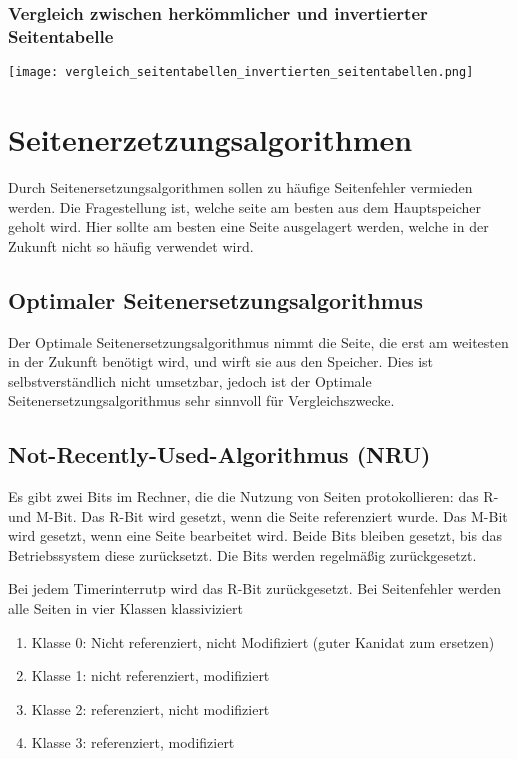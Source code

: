 \subsubsection*{Vergleich zwischen herkömmlicher und invertierter Seitentabelle}

\texttt{[image: vergleich\_seitentabellen\_invertierten\_seitentabellen.png]}

\section{Seitenerzetzungsalgorithmen}

Durch Seitenersetzungsalgorithmen sollen zu häufige Seitenfehler vermieden werden. Die Fragestellung ist, welche seite am besten aus dem Hauptspeicher geholt wird. Hier sollte am besten eine Seite ausgelagert werden, welche in der Zukunft nicht so häufig verwendet wird. 

\subsection{Optimaler Seitenersetzungsalgorithmus}

Der Optimale Seitenersetzungsalgorithmus nimmt die Seite, die erst am weitesten in der Zukunft benötigt wird, und wirft sie aus den Speicher. Dies ist selbstverständlich nicht umsetzbar, jedoch ist der Optimale Seitenersetzungsalgorithmus sehr sinnvoll für Vergleichszwecke.

\subsection{Not-Recently-Used-Algorithmus (NRU)}

Es gibt zwei Bits im Rechner, die die Nutzung von Seiten protokollieren: das R- und M-Bit. Das R-Bit wird gesetzt, wenn die Seite referenziert wurde. Das M-Bit wird gesetzt, wenn eine Seite bearbeitet wird. Beide Bits bleiben gesetzt, bis das Betriebssystem diese zurücksetzt. Die Bits werden regelmäßig zurückgesetzt.

Bei jedem Timerinterrutp wird das R-Bit zurückgesetzt. Bei Seitenfehler werden alle Seiten in vier Klassen klassiviziert

\begin{enumerate}
    \item Klasse 0: Nicht referenziert, nicht Modifiziert (guter Kanidat zum ersetzen)
    \item Klasse 1: nicht referenziert, modifiziert
    \item Klasse 2: referenziert, nicht modifiziert
    \item Klasse 3: referenziert, modifiziert
\end{enumerate}

